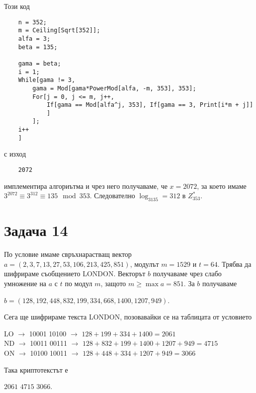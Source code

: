 \documentclass{article}
\begin{document}
\justify
Този код 
\begin{verbatim}
    n = 352;
    m = Ceiling[Sqrt[352]];
    alfa = 3;
    beta = 135;

    gama = beta;
    i = 1;
    While[gama != 3, 
        gama = Mod[gama*PowerMod[alfa, -m, 353], 353];
        For[j = 0, j <= m, j++,
            If[gama == Mod[alfa^j, 353], If[gama == 3, Print[i*m + j]]
            ]
        ];
    i++
    ]
\end{verbatim}
с изход 
\begin{verbatim}
    2072
\end{verbatim}
имплементира алгориътма и чрез него получаваме, че $x = 2072$, за което имаме $3^{2072} \equiv 3^{312} \equiv 135 \mod 353$. Следователно $\log_3135 = 312$ в $Z^*_{353}$.

\section*{Задача 14}

\justify
По условие имаме свръхнарастващ вектор 
$a = (2,3,7,13,27,53,106,213,425,851)$, модулът $m = 1529$ и $t = 64$. 
Трябва да шифрираме съобщението LONDON. Векторът $b$ получаваме чрез слабо умножение на $a$ с $t$ по модул $m$, защото $m \geq \max a = 851$. За $b$ получаваме
\begin{center}
    $b = (128, 192, 448, 832, 199, 334, 668, 1400, 1207, 949)$.
\end{center}
Сега ще шифрираме текста LONDON, позовавайки се на таблицата от условието
\begin{center}
    LO $\rightarrow$ 10001 10100 $\rightarrow$ $128+199+334+1400 = 2061$\\
    ND $\rightarrow$ 10011 00111 $\rightarrow$ $128+832+199+1400+1207+949 = 4715$ \\
    ON $\rightarrow$ 10100 10011 $\rightarrow$ $128+448+334+1207+949 = 3066$
\end{center}
Така криптотекстът е 
\begin{center}
    $2061$ $4715$ $3066$.
\end{center}
\end{document}
